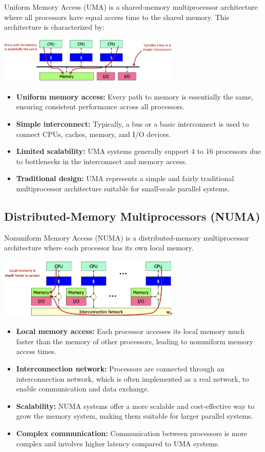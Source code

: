 Uniform Memory Access (UMA) is a shared-memory multiprocessor architecture where all processors have equal access time to the shared memory. This architecture is characterized by:
\begin{center}
    \includegraphics[width=0.65\textwidth]{chapters/chapter5a/images/smm.png}
\end{center}
\begin{itemize}
    \item \textbf{Uniform memory access:} Every path to memory is essentially the same, ensuring consistent performance across all processors.
    \item \textbf{Simple interconnect:} Typically, a bus or a basic interconnect is used to connect CPUs, caches, memory, and I/O devices.
    \item \textbf{Limited scalability:} UMA systems generally support 4 to 16 processors due to bottlenecks in the interconnect and memory access.
    \item \textbf{Traditional design:} UMA represents a simple and fairly traditional multiprocessor architecture suitable for small-scale parallel systems.
\end{itemize}

\subsection{Distributed-Memory Multiprocessors (NUMA)}
Nonuniform Memory Access (NUMA) is a distributed-memory multiprocessor architecture where each processor has its own local memory.
\begin{center}
    \includegraphics[width=0.65\textwidth]{chapters/chapter5a/images/dmm.png}
\end{center}
\begin{itemize}
    \item \textbf{Local memory access:} Each processor accesses its local memory much faster than the memory of other processors, leading to nonuniform memory access times.
    \item \textbf{Interconnection network:} Processors are connected through an interconnection network, which is often implemented as a real network, to enable communication and data exchange.
    \item \textbf{Scalability:} NUMA systems offer a more scalable and cost-effective way to grow the memory system, making them suitable for larger parallel systems.
    \item \textbf{Complex communication:} Communication between processors is more complex and involves higher latency compared to UMA systems.
\end{itemize}

